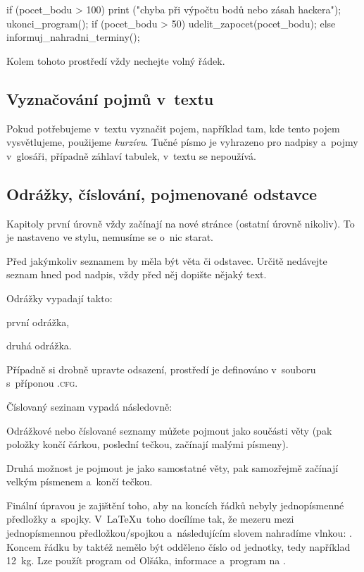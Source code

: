 \begin{prog}
if (pocet_bodu > 100) {
	print ("chyba při výpočtu bodů nebo zásah hackera");
	ukonci_program();
}
if (pocet_bodu > 50)
	udelit_zapocet(pocet_bodu);
else
	informuj_nahradni_terminy();
\end{prog}

Kolem tohoto prostředí vždy nechejte volný řádek.



\subsection{Vyznačování pojmů v~textu}

Pokud potřebujeme v~textu vyznačit pojem, například tam, kde tento pojem vysvětlujeme, použijeme \emph{kurzívu}. Tučné písmo je vyhrazeno pro nadpisy a~pojmy v~glosáři, případně záhlaví tabulek, v~textu se nepoužívá.



\subsection{Odrážky, číslování, pojmenované odstavce}

Kapitoly první úrovně vždy začínají na nové stránce (ostatní úrovně nikoliv). To je nastaveno ve stylu, nemusíme se o~nic starat.

Před jakýmkoliv seznamem by měla být  věta či odstavec. Určitě nedávejte seznam hned pod nadpis, vždy před něj dopište nějaký text.

Odrážky vypadají takto:
\begin{citemize}
	\item první odrážka,
	\item druhá odrážka.
\end{citemize}
Případně si drobně upravte odsazení, prostředí je definováno v~souboru s~příponou .\textsc{cfg}.

Číslovaný sezinam vypadá následovně:
\begin{cenumerate}
	\item Odrážkové nebo číslované seznamy můžete pojmout jako součásti věty (pak položky končí čárkou, poslední tečkou, začínají malými písmeny).
	\item Druhá možnost je pojmout je jako samostatné věty, pak samozřejmě začínají velkým písmenem a~končí tečkou.
\end{cenumerate}

Finální úpravou je zajištění toho, aby na koncích řádků nebyly jednopísmenné předložky a~spojky. V~\LaTeX u~toho docílíme tak, že mezeru mezi jednopísmennou předložkou/spojkou a~následujícím slovem nahradíme vlnkou: \vlnka{}. Koncem řádku by taktéž nemělo být odděleno číslo od jednotky, tedy například 12~kg. Lze použít program  od Olšáka, informace a~program na \cite{vlnazdroj}.

